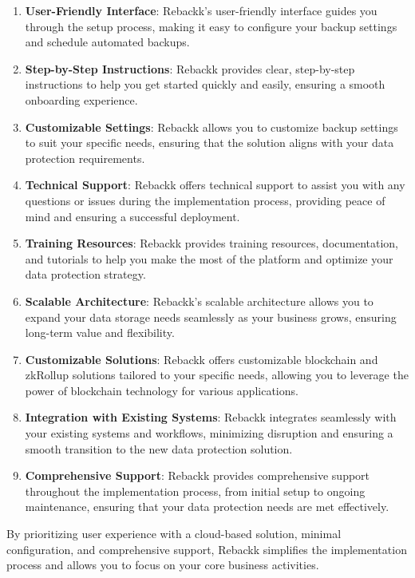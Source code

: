\documentclass[12pt]{article}
\begin{document}
\begin{enumerate}
    \item \textbf{User-Friendly Interface}: Rebackk's user-friendly interface guides you through the setup process, making it easy to configure your backup settings and schedule automated backups.
    \item \textbf{Step-by-Step Instructions}: Rebackk provides clear, step-by-step instructions to help you get started quickly and easily, ensuring a smooth onboarding experience.
    \item \textbf{Customizable Settings}: Rebackk allows you to customize backup settings to suit your specific needs, ensuring that the solution aligns with your data protection requirements.
    \item \textbf{Technical Support}: Rebackk offers technical support to assist you with any questions or issues during the implementation process, providing peace of mind and ensuring a successful deployment.
    \item \textbf{Training Resources}: Rebackk provides training resources, documentation, and tutorials to help you make the most of the platform and optimize your data protection strategy.
    \item \textbf{Scalable Architecture}: Rebackk's scalable architecture allows you to expand your data storage needs seamlessly as your business grows, ensuring long-term value and flexibility.
    \item \textbf{Customizable Solutions}: Rebackk offers customizable blockchain and zkRollup solutions tailored to your specific needs, allowing you to leverage the power of blockchain technology for various applications.
    \item \textbf{Integration with Existing Systems}: Rebackk integrates seamlessly with your existing systems and workflows, minimizing disruption and ensuring a smooth transition to the new data protection solution.
    \item \textbf{Comprehensive Support}: Rebackk provides comprehensive support throughout the implementation process, from initial setup to ongoing maintenance, ensuring that your data protection needs are met effectively.
\end{enumerate}

By prioritizing user experience with a cloud-based solution, minimal configuration, and comprehensive support, Rebackk simplifies the implementation process and allows you to focus on your core business activities.
\end{document}
